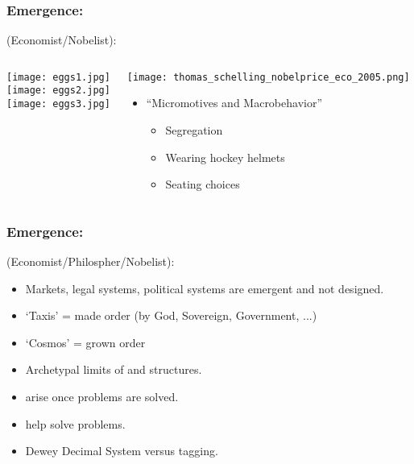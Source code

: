 \begin{frame}
  \frametitle{Emergence:}

  \begin{block}{
      \smallskip
      (Economist/Nobelist):}
    \medskip
    \begin{columns}
      \texttt{[image: eggs1.jpg]}\\
      \texttt{[image: eggs2.jpg]}\\
      \texttt{[image: eggs3.jpg]}\\
      \begin{center}
      \texttt{[image: thomas\_schelling\_nobelprice\_eco\_2005.png]}
      \begin{itemize}
      \item 
        ``Micromotives and Macrobehavior''\cite{schelling1978a}
        \begin{itemize}
        \item
          Segregation\cite{schelling1971a,schelling2006a}
        \item
          Wearing hockey helmets\cite{schelling1973a}
        \item
          Seating choices
        \end{itemize}
      \end{itemize}
      \end{center}
    \end{columns}
  \end{block}

\end{frame}



\begin{frame}
  \frametitle{Emergence:}

  \begin{block}{
      \smallskip
      (Economist/Philospher/Nobelist):
    }
    \begin{itemize}
    \item<1-> Markets, legal systems, political systems are emergent and not designed.
    \item<2->   
      `Taxis' = made order (by God, Sovereign, Government, ...)
    \item<3->
      `Cosmos' = grown order
    \item<4->
      Archetypal limits of  and  structures.
    \item<5->
       arise once problems are solved.\cite{dodds2003c}
    \item<6->
       help solve problems.
    \item<7->
      Dewey Decimal System versus tagging.
    \end{itemize}
  \end{block}

\end{frame}

